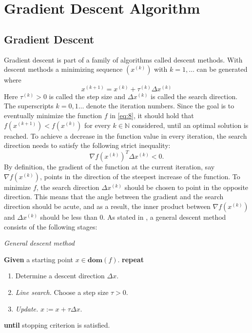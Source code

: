 \section{Gradient Descent Algorithm}\label{sec: GD}
\subsection{Gradient Descent}
Gradient descent is part of a family of algorithms called descent methods. With descent methods a minimizing sequence $(x^{(k)})$ with $k = 1,\ldots$ can be generated where $$x^{(k+1)} = x^{(k)} + \tau^{(k)} \Delta x^{(k)}$$ Here $\tau^{(k)} > 0$ is called the step size and $\Delta x^{(k)}$ is called the search direction. The superscripts $k=0,1\ldots$ denote the iteration numbers. Since the goal is to eventually minimize the function $f$ in \eqref{eq:8}, it should hold that $f(x^{(k+1)}) < f(x^{(k)})$ for every $k \in \mathbb{N}$ considered, until an optimal solution is reached. To achieve a decrease in the function value in every iteration, the search direction needs to satisfy the following strict inequality: $$\nabla f(x^{(k)})^{T} \Delta x^{(k)} < 0.$$ By definition, the gradient of the function at the current iteration, say $\nabla f(x^{(k)})$, points in the direction of the steepest increase of the function. To minimize $f$, the search direction $\Delta x^{(k)}$ should be chosen to point in the opposite direction. This means that the angle between the gradient and the search direction should be acute, and as a result, the inner product between $\nabla f(x^{(k)})$ and $\Delta x^{(k)}$ should be less than 0. As stated in \cite[464]{boyd2004convex}, a general descent method consists of the following stages: 
\begin{algorithm}
\caption{\textit{General descent method}}
\begin{algorithmic}
\State \textbf{Given} a starting point $x \in \textbf{dom} (f)$.
\vspace{0.03cm}
\State \textbf{repeat}\\
\begin{enumerate}
    \item Determine a descent direction $\Delta x.$
    \item \textit{Line search.} Choose a step size $\tau > 0$.
    \item \textit{Update.} $x := x + \tau \Delta x.$
\end{enumerate}
\State \textbf{until} stopping criterion is satisfied.
\end{algorithmic}
\end{algorithm}\\
